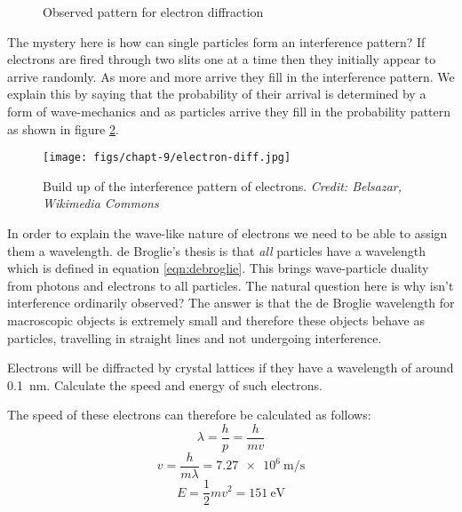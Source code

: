 \documentclass[revision-guide.tex]{subfiles}
\begin{document}
\begin{figure}[!h]
  \begin{center}
  \end{center}
  \caption{Observed pattern for electron diffraction}
  \label{fig:electron-diff-observed}
\end{figure}

The mystery here is how can single particles form an interference pattern? If electrons are fired through two slits one at a time then they initially appear to arrive randomly. As more and more arrive they fill in the interference pattern. We explain this by saying that the probability of their arrival is determined by a form of wave-mechanics and as particles arrive they fill in the probability pattern as shown in figure \ref{fig:electron-buildup}.

\begin{figure}
  \begin{center}
  \texttt{[image: figs/chapt-9/electron-diff.jpg]}
\end{center}
  \caption{Build up of the interference pattern of electrons. \emph{Credit: Belsazar, Wikimedia Commons}}
  \label{fig:electron-buildup}
\end{figure}

\clearpage


In order to explain the wave-like nature of electrons we need to be able to assign them a wavelength. de Broglie's thesis is that \emph{all} particles have a wavelength which is defined in equation \ref{eqn:debroglie}. This brings wave-particle duality from photons and electrons to all particles. The natural question here is why isn't interference ordinarily observed? The answer is that the de Broglie wavelength for macroscopic objects is extremely small and therefore these objects behave as particles, travelling in straight lines and not undergoing interference.

\begin{example}
Electrons will be diffracted by crystal lattices if they have a wavelength of around \SI{0.1}{\nano\metre}. Calculate the speed and energy of such electrons.

\answer
The speed of these electrons can therefore be calculated as follows:
\[ \lambda = \frac{h}{p} = \frac{h}{mv} \]
\[ v = \frac{h}{m\lambda} = \SI{7.27e6}{\meter\per\second} \]
\[ E = \frac{1}{2}mv^2 = \SI{151}{\electronvolt} \]

\end{example}
\end{document}
